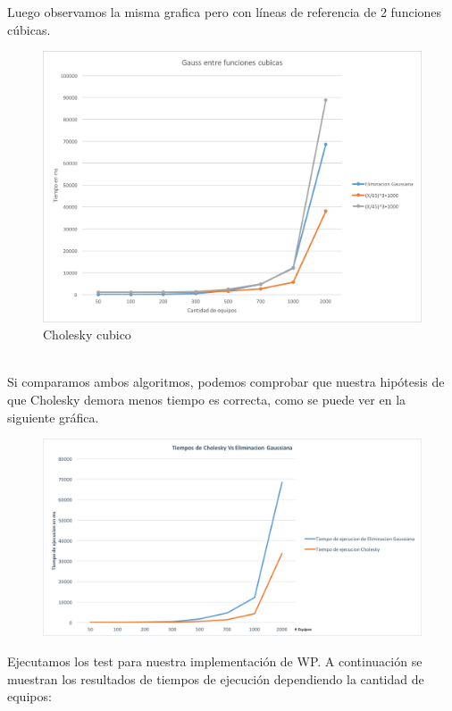 Luego observamos la misma grafica pero con líneas de referencia de 2 funciones cúbicas.\\

\begin{figure}[H]
\centering
\includegraphics[width=1\textwidth]{IMG/gaussEntreCubicas.png}
\caption{Cholesky cubico}
\label{fig:Cholesky cubico}
\end{figure}

\\

Si comparamos ambos algoritmos, podemos comprobar que nuestra hipótesis de que Cholesky demora menos tiempo es correcta, como se puede ver en la siguiente gráfica.

\begin{figure}[H]
\centering
\includegraphics[width=1\textwidth]{IMG/tiemposgsvscholesky.png}
\end{figure}


Ejecutamos los test para nuestra implementación de WP. A continuación se muestran los resultados de tiempos de ejecución dependiendo la cantidad de equipos: \\


